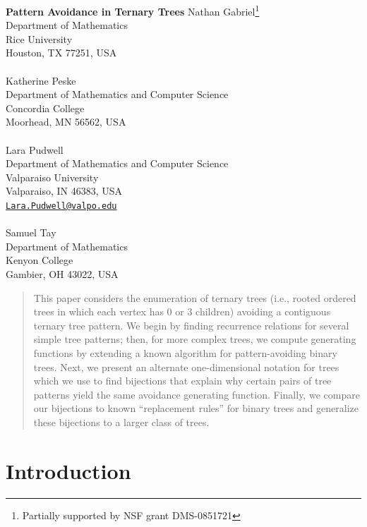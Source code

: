 \documentclass[12pt]{article}
\begin{document}
\begin{center}
\vskip 1cm{\LARGE\bf Pattern Avoidance in Ternary Trees
}
\vskip 1cm
\large
Nathan Gabriel\footnote{Partially supported by NSF grant DMS-0851721}\\
Department of Mathematics\\
Rice University\\
Houston, TX 77251, USA \\
\ \\
Katherine Peske\footnotemark[1]\\ 
Department of Mathematics and Computer Science\\
Concordia College\\
Moorhead, MN 56562, USA\\
\ \\
Lara Pudwell\footnotemark[1]  \\
Department of Mathematics and Computer Science\\
Valparaiso University\\
Valparaiso, IN 46383, USA\\
\href{mailto:Lara.Pudwell@valpo.edu}{\tt Lara.Pudwell@valpo.edu}\\
\ \\
Samuel Tay\footnotemark[1]\\
Department of Mathematics \\
Kenyon College\\
Gambier, OH 43022, USA
\end{center}

\begin{abstract}
This paper considers the enumeration of ternary trees (i.e., rooted ordered trees in which each vertex has 0 or 3 children) avoiding a contiguous ternary tree pattern.  We begin by finding recurrence relations for several simple tree patterns; then, for more complex trees, we compute generating functions by extending a known algorithm for pattern-avoiding binary trees.  Next, we present an alternate one-dimensional notation for trees which we use to find bijections that explain why certain pairs of tree patterns yield the same avoidance generating function.  Finally, we compare our bijections to known ``replacement rules'' for binary trees and generalize these bijections to a larger class of trees.
\end{abstract}

\section{Introduction}\label{S:Intro}
\end{document}
